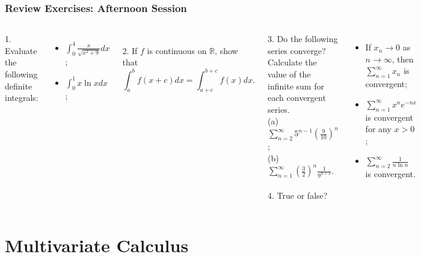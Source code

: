 \documentclass{beamer}
\begin{document}
\begin{frame}
\frametitle{Review Exercises: Afternoon Session}
\begin{columns}[t] %

1. Evaluate the following definite integrals:
\begin{itemize}
\item $\int_0^4 \frac{x}{\sqrt{x^2+9}}dx$;
\item $\int_0^1 x\ln xdx$;
\end{itemize}
~\\
2. If $f$ is continuous on $\mathbb{R}$, show that
$$
\int_{a}^{b} f(x+c) dx = \int_{a+c}^{b+c} f(x) dx.
$$

3. Do the following series converge? Calculate the value of the infinite sum for each convergent series.\\
(a) $\sum_{n=2}^{\infty} 5^{n-1}\left(\frac{9}{10}\right)^{n}$;\\
(b) $\sum_{n=1}^{\infty} \left(\frac{3}{2}\right)^{n}\frac{1}{9^{n+2}}$.
\\~\\
4. True or false?
\begin{itemize}
\item If $x_n \rightarrow 0$ as $n \rightarrow \infty$, then $\sum_{n=1}^{\infty} x_n$ is convergent;
\item $\sum_{n=1}^{\infty} x^n e^{-nx}$ is convergent for any $x > 0$;
\item $\sum_{n=2}^{\infty} \frac{1}{n \ln n}$ is convergent.
\end{itemize}
\end{columns}
\end{frame}

\section{Multivariate Calculus}
\end{document}
